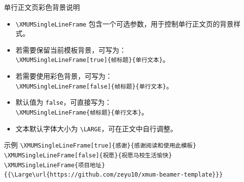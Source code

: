 \documentclass[aspectratio=169,11pt]{ctexbeamer}
\begin{document}
%     
%     

\begin{frame}{单行正文页彩色背景说明}
    \vspace{-2pt}
    \begin{itemize}
        \item \texttt{\textbackslash XMUMSingleLineFrame} 包含一个可选参数，用于控制单行正文页的背景样式。
        \item 若需要保留当前模板背景，可写为：\\ \texttt{\textbackslash XMUMSingleLineFrame[true]\{帧标题\}\{单行文本\}}。
        \item 若需要使用彩色背景，可写为：\\ \texttt{\textbackslash XMUMSingleLineFrame[false]\{帧标题\}\{单行文本\}}。
        \item 默认值为 \texttt{false}，可直接写为：\\ \texttt{\textbackslash XMUMSingleLineFrame\{帧标题\}\{单行文本\}}。
        \item 文本默认字体大小为 \texttt{\textbackslash LARGE}，可在正文中自行调整。
    \end{itemize}
    \vspace{-2pt}
    \begin{block}{示例}
        \texttt{\textbackslash XMUMSingleLineFrame[true]\{感谢\}\{感谢阅读和使用此模板\}}
        \texttt{\textbackslash XMUMSingleLineFrame[false]\{祝愿\}\{祝愿马校生活愉快\}}
        \texttt{\textbackslash XMUMSingleLineFrame\{项目地址\} \\ \{\{\textbackslash Large\textbackslash url\{https://github.com/zeyu10/xmum-beamer-template\}\}\}}
    \end{block}
\end{frame}



\end{document}
